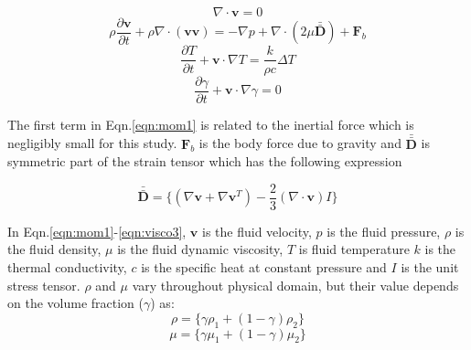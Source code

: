 \documentclass[12pt]{article}
\begin{document}
\begin{equation}
\nabla\cdot\pmb{v}  =   0  
\label{eqn:mass_cons}
\end{equation}
\begin{equation}
\rho \frac {\partial\pmb{v}}{\partial t} + \rho \nabla\cdot(\pmb{v}\pmb{v})  
= - \nabla p + \nabla\cdot(2\mu \bar{\bar{ \textbf{D}}}) +  \textbf{F}_b
\label{eqn:mom1}
\end{equation}
\begin{equation}
\frac {\partial T}{\partial t} + \pmb{v}\cdot  \nabla T 
= \frac {k}{\rho c}\Delta T
\label{eqn:temp1}
\end{equation}
\begin{equation}
\frac {\partial \gamma}{\partial t} + \pmb{v}\cdot  \nabla \gamma 
= 0
\label{eqn:gamma1}
\end{equation}


The first term in Eqn.\ref{eqn:mom1} is related to the inertial force which is negligibly small for this study.  $\textbf{F}_b$ is the body force due to gravity and $\bar{\bar{ \textbf{D}}}$ is symmetric part of the strain tensor which has the following expression

\begin{equation}
  \bar{\bar{ \textbf{D}}} = \{ (\nabla\pmb{v} + \nabla\pmb{v}^T) 
   - \frac {2}{3}  (\nabla\cdot\pmb{v})I \}
\label{eqn:visco3}
\end{equation}


In Eqn.\ref{eqn:mom1}-\ref{eqn:visco3}, $\pmb{v}$ is the fluid velocity, $p$ is the fluid pressure, $\rho$ is the fluid density, $\mu$ is the fluid dynamic viscosity, $T$ is fluid temperature $k$ is the thermal conductivity, $c$ is the specific heat at constant pressure and $I$ is the unit stress tensor. $\rho$ and $\mu$  vary throughout physical domain, but their value depends on the volume fraction ($\gamma$) as:
\begin{equation}
\rho = \{ \gamma \rho_1 +(1-\gamma)\rho_2 \}
\label{eqn:vf1}
\end{equation}
\begin{equation}
\mu = \{ \gamma \mu_1 +(1-\gamma)\mu_2 \}
\label{eqn:visco1}
\end{equation}

\end{document}
